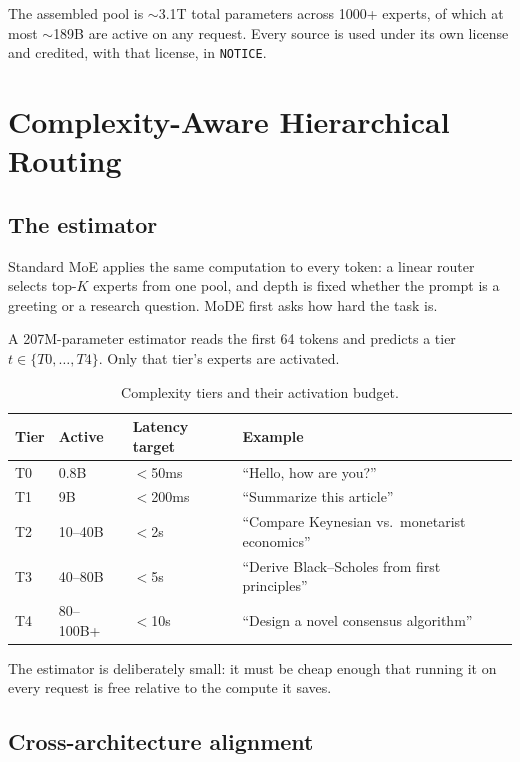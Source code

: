 \documentclass[11pt,a4paper]{article}
\begin{document}
The assembled pool is $\sim$3.1T total parameters across 1000+ experts, of which at most
$\sim$189B are active on any request. Every source is used under its own license and
credited, with that license, in \texttt{NOTICE}.

\section{Complexity-Aware Hierarchical Routing}

\subsection{The estimator}

Standard MoE applies the same computation to every token: a linear router selects top-$K$
experts from one pool, and depth is fixed whether the prompt is a greeting or a research
question. MoDE first asks how hard the task is.

A 207M-parameter estimator reads the first 64 tokens and predicts a tier
$t \in \{T0,\dots,T4\}$. Only that tier's experts are activated.

\begin{table}[H]
\centering
\caption{Complexity tiers and their activation budget.}
\begin{tabular}{llll}
\toprule
\textbf{Tier} & \textbf{Active} & \textbf{Latency target} & \textbf{Example} \\
\midrule
T0 & 0.8B      & $<$50ms  & ``Hello, how are you?'' \\
T1 & 9B        & $<$200ms & ``Summarize this article'' \\
T2 & 10--40B   & $<$2s    & ``Compare Keynesian vs.\ monetarist economics'' \\
T3 & 40--80B   & $<$5s    & ``Derive Black--Scholes from first principles'' \\
T4 & 80--100B+ & $<$10s   & ``Design a novel consensus algorithm'' \\
\bottomrule
\end{tabular}
\end{table}

The estimator is deliberately small: it must be cheap enough that running it on every
request is free relative to the compute it saves.

\subsection{Cross-architecture alignment}
\end{document}
